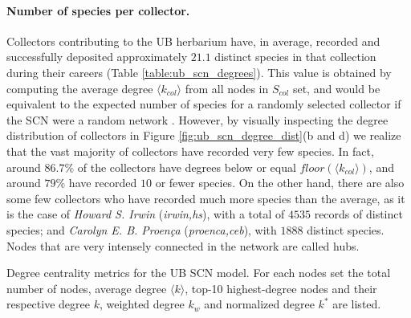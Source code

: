 \paragraph*{Number of species per collector.}
Collectors contributing to the UB herbarium have, in average, recorded and successfully deposited approximately $21.1$ distinct species in that collection during their careers (Table \ref{table:ub_scn_degrees}). This value is obtained by computing the average degree $\langle k_{col} \rangle$ from all nodes in $S_{col}$ set, and would be equivalent to the expected number of species for a randomly selected collector if the SCN were a random network \cite{Albert2002}.
However, by visually inspecting the degree distribution of collectors in Figure \ref{fig:ub_scn_degree_dist}(b and d) we realize that the vast majority of collectors have recorded very few species. In fact, around $86.7\%$ of the collectors have degrees below or equal $floor(\langle k_{col} \rangle)$, and around $79\%$ have recorded $10$ or fewer species.
On the other hand, there are also some few collectors who have recorded much more species than the average, as it is the case of \textit{Howard S. Irwin} (\textit{irwin,hs}), with a total of $4535$ records of distinct species; and \textit{Carolyn E. B. Proença} (\textit{proenca,ceb}), with $1888$ distinct species. Nodes that are very intensely connected in the network are called hubs.

\begin{table}[t]
\caption{ Degree centrality metrics for the UB SCN model. For each nodes set the total number of nodes, average degree $\langle k \rangle$, top-10 highest-degree nodes and their respective degree $k$, weighted degree $k_w$ and normalized degree $k^*$ are listed.}
\begin{center}
	
\end{center}
\label{table:ub_scn_degrees}
\end{table}

